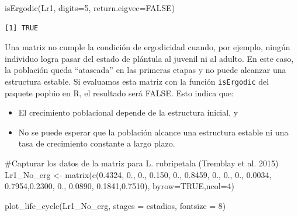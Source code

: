 \documentclass[
  12pt,
  letterpaper,
]{book}
\newenvironment{Shaded}{\begin{snugshade}}{\end{snugshade}}
\newcommand{\AttributeTok}[1]{\textcolor[rgb]{0.40,0.45,0.13}{#1}}
\newcommand{\CommentTok}[1]{\textcolor[rgb]{0.37,0.37,0.37}{#1}}
\newcommand{\ConstantTok}[1]{\textcolor[rgb]{0.56,0.35,0.01}{#1}}
\newcommand{\DecValTok}[1]{\textcolor[rgb]{0.68,0.00,0.00}{#1}}
\newcommand{\FloatTok}[1]{\textcolor[rgb]{0.68,0.00,0.00}{#1}}
\newcommand{\FunctionTok}[1]{\textcolor[rgb]{0.28,0.35,0.67}{#1}}
\newcommand{\NormalTok}[1]{\textcolor[rgb]{0.00,0.23,0.31}{#1}}
\newcommand{\OtherTok}[1]{\textcolor[rgb]{0.00,0.23,0.31}{#1}}
\providecommand{\tightlist}{%
  \setlength{\itemsep}{0pt}\setlength{\parskip}{0pt}}\usepackage{longtable,booktabs,array}
\begin{document}
\begin{Shaded}
\begin{Highlighting}[]
\FunctionTok{isErgodic}\NormalTok{(Lr1, }\AttributeTok{digits=}\DecValTok{5}\NormalTok{, }\AttributeTok{return.eigvec=}\ConstantTok{FALSE}\NormalTok{)}
\end{Highlighting}
\end{Shaded}

\begin{verbatim}
[1] TRUE
\end{verbatim}

Una matriz no cumple la condición de ergodicidad cuando, por ejemplo,
ningún individuo logra pasar del estado de plántula al juvenil ni al
adulto. En este caso, la población queda ``atascada'' en las primeras
etapas y no puede alcanzar una estructura estable. Si evaluamos esta
matriz con la función \texttt{isErgodic} del paquete popbio en R, el
resultado será FALSE. Esto indica que:

\begin{itemize}
\tightlist
\item
  El crecimiento poblacional depende de la estructura inicial, y
\item
  No se puede esperar que la población alcance una estructura estable ni
  una tasa de crecimiento constante a largo plazo.
\end{itemize}

\begin{Shaded}
\begin{Highlighting}[]
\CommentTok{\#Capturar los datos de la matriz para L. rubripetala (Tremblay et al. 2015)}
\NormalTok{Lr1\_No\_erg }\OtherTok{\textless{}{-}} \FunctionTok{matrix}\NormalTok{(}\FunctionTok{c}\NormalTok{(}\FloatTok{0.4324}\NormalTok{, }\FloatTok{0.}\NormalTok{,      }\FloatTok{0.}\NormalTok{,     }\FloatTok{0.150}\NormalTok{,}
               \FloatTok{0.}\NormalTok{, }\FloatTok{0.8459}\NormalTok{, }\FloatTok{0.}\NormalTok{,     }\FloatTok{0.}\NormalTok{,}
               \FloatTok{0.}\NormalTok{,      }\FloatTok{0.0034}\NormalTok{, }\FloatTok{0.7954}\NormalTok{,}\FloatTok{0.2300}\NormalTok{,}
               \FloatTok{0.}\NormalTok{,      }\FloatTok{0.0890}\NormalTok{, }\FloatTok{0.1841}\NormalTok{,}\FloatTok{0.7510}\NormalTok{), }\AttributeTok{byrow=}\ConstantTok{TRUE}\NormalTok{,}\AttributeTok{ncol=}\DecValTok{4}\NormalTok{)}


\FunctionTok{plot\_life\_cycle}\NormalTok{(Lr1\_No\_erg, }\AttributeTok{stages =}\NormalTok{ estadios, }\AttributeTok{fontsize =} \DecValTok{8}\NormalTok{)}
\end{Highlighting}
\end{Shaded}
\end{document}
